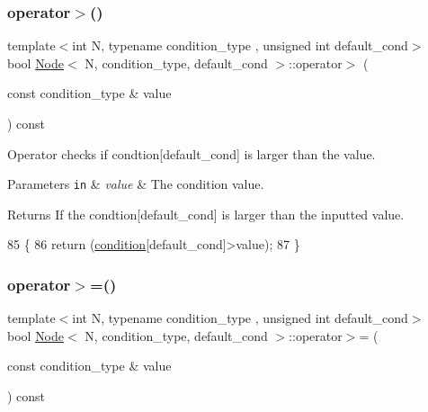 \subsubsection{\texorpdfstring{operator$>$()}{operator>()}}
{\footnotesize\ttfamily template$<$int N, typename condition\+\_\+type , unsigned int default\+\_\+cond$>$ \\
bool \hyperlink{struct_node}{Node}$<$ N, condition\+\_\+type, default\+\_\+cond $>$\+::operator$>$ (\begin{DoxyParamCaption}\item[{const condition\+\_\+type \&}]{value }\end{DoxyParamCaption}) const\hspace{0.3cm}{\ttfamily [inline]}}

Operator checks if {\ttfamily condtion}\mbox{[}{\ttfamily default\+\_\+cond}\mbox{]} is larger than the value. 
\begin{DoxyParams}[1]{Parameters}
\mbox{\tt in}  & {\em value} & The condition value. \\
\hline
\end{DoxyParams}
\begin{DoxyReturn}{Returns}
If the {\ttfamily condtion}\mbox{[}{\ttfamily default\+\_\+cond}\mbox{]} is larger than the inputted value. 
\end{DoxyReturn}

\begin{DoxyCode}
85     \{
86         \textcolor{keywordflow}{return} (\hyperlink{struct_node_a84fa4c586396e81041eb3a4f6a46f418}{condition}[default\_cond]>value);
87     \}
\end{DoxyCode}
\mbox{\label{struct_node_a6ffc542cb938c021de9086e34c65b890}} 
\subsubsection{\texorpdfstring{operator$>$=()}{operator>=()}}
{\footnotesize\ttfamily template$<$int N, typename condition\+\_\+type , unsigned int default\+\_\+cond$>$ \\
bool \hyperlink{struct_node}{Node}$<$ N, condition\+\_\+type, default\+\_\+cond $>$\+::operator$>$= (\begin{DoxyParamCaption}\item[{const condition\+\_\+type \&}]{value }\end{DoxyParamCaption}) const\hspace{0.3cm}{\ttfamily [inline]}}

